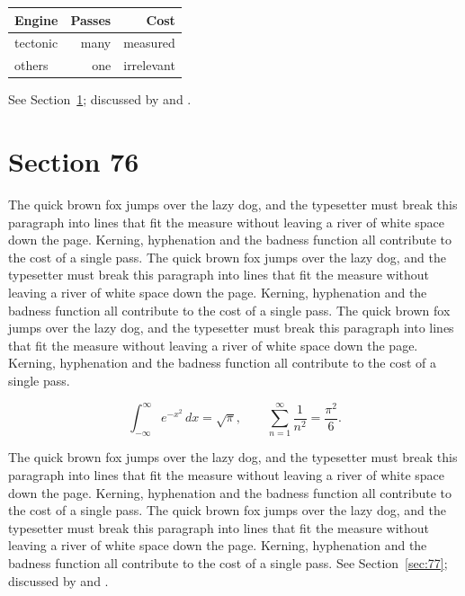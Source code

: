 \documentclass{article}
\begin{document}
\begin{center}
\begin{tabular}{lrr}
\toprule
Engine & Passes & Cost \\
\midrule
tectonic & many & measured \\
others & one & irrelevant \\
\bottomrule
\end{tabular}
\end{center}

See Section~\ref{sec:76}; discussed by \textcite{k1} and \textcite{l3}.
\section{Section 76}
\label{sec:76}
The quick brown fox jumps over the lazy dog, and the typesetter must break this paragraph into lines that fit the measure without leaving a river of white space down the page. Kerning, hyphenation and the badness function all contribute to the cost of a single pass. The quick brown fox jumps over the lazy dog, and the typesetter must break this paragraph into lines that fit the measure without leaving a river of white space down the page. Kerning, hyphenation and the badness function all contribute to the cost of a single pass. The quick brown fox jumps over the lazy dog, and the typesetter must break this paragraph into lines that fit the measure without leaving a river of white space down the page. Kerning, hyphenation and the badness function all contribute to the cost of a single pass. 

\begin{equation}\label{eq:76}
\int_{-\infty}^{\infty} e^{-x^{2}}\,dx = \sqrt{\pi}, \qquad
\sum_{n=1}^{\infty} \frac{1}{n^{2}} = \frac{\pi^{2}}{6}.
\end{equation}

The quick brown fox jumps over the lazy dog, and the typesetter must break this paragraph into lines that fit the measure without leaving a river of white space down the page. Kerning, hyphenation and the badness function all contribute to the cost of a single pass. The quick brown fox jumps over the lazy dog, and the typesetter must break this paragraph into lines that fit the measure without leaving a river of white space down the page. Kerning, hyphenation and the badness function all contribute to the cost of a single pass. 
See Section~\ref{sec:77}; discussed by \textcite{k2} and \textcite{l4}.
\end{document}
